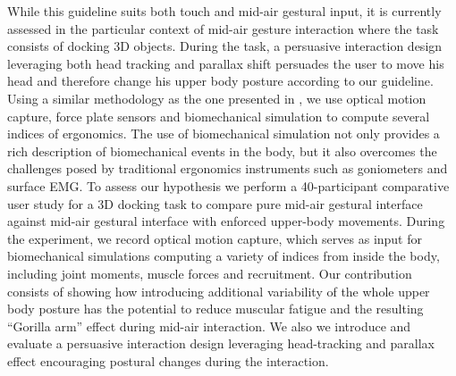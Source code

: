 While this guideline suits both touch and mid-air gestural input, it is currently assessed in the particular context of mid-air gesture interaction where the task consists of docking 3D objects. During the task, a persuasive interaction design leveraging both head tracking and parallax shift persuades the user to move his head and therefore change his upper body posture according to our guideline. Using a similar methodology as the one presented in \cite{bachynskyi_performance_2015}, we use optical motion capture, force plate sensors and biomechanical simulation to compute several indices of ergonomics. The use of biomechanical simulation not only provides a rich description of biomechanical events in the body, but it also overcomes the challenges posed by traditional ergonomics instruments such as goniometers and surface EMG.
To assess our hypothesis we perform a 40-participant comparative user study for a 3D docking task to compare pure mid-air gestural interface against mid-air gestural interface with enforced upper-body movements.
During the experiment, we record optical motion capture, which serves as input for biomechanical simulations computing a variety of indices from inside the body, including joint moments, muscle forces and recruitment. Our contribution consists of showing how introducing additional variability of the whole upper body posture has the potential to reduce muscular fatigue and the resulting ``Gorilla arm'' effect during mid-air interaction. We also we introduce and evaluate a persuasive interaction design leveraging head-tracking and parallax effect encouraging postural changes during the interaction.
